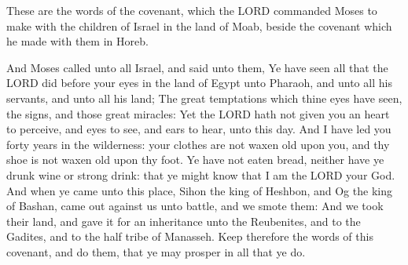  These are the words of the covenant, which the LORD
commanded Moses to make with the children of Israel in the land of Moab,
beside the covenant which he made with them in Horeb.

 And Moses called unto all Israel, and said unto them, Ye
have seen all that the LORD did before your eyes in the land of Egypt
unto Pharaoh, and unto all his servants, and unto all his land;
 The great temptations which thine eyes have seen, the
signs, and those great miracles:  Yet the LORD hath not
given you an heart to perceive, and eyes to see, and ears to hear, unto
this day.  And I have led you forty years in the wilderness:
your clothes are not waxen old upon you, and thy shoe is not waxen old
upon thy foot.  Ye have not eaten bread, neither have ye
drunk wine or strong drink: that ye might know that I am the LORD your
God.  And when ye came unto this place, Sihon the king of
Heshbon, and Og the king of Bashan, came out against us unto battle, and
we smote them:  And we took their land, and gave it for an
inheritance unto the Reubenites, and to the Gadites, and to the half
tribe of Manasseh.  Keep therefore the words of this
covenant, and do them, that ye may prosper in all that ye do.

